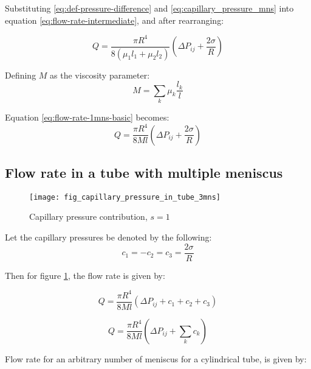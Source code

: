 	Substituting \ref{eq:def-pressure-difference} and \ref{eq:capillary_pressure_mns} into equation \ref{eq:flow-rate-intermediate}, and after rearranging:
	
	\begin{equation} \label{eq:flow-rate-1mns-basic}
		Q = \frac{\pi R^4}{8({\mu}_1 l_1 + {\mu}_2 l_2)} \left( \Delta P_{ij} + \frac{2\sigma}{R} \right)
	\end{equation}
	
	Defining $M$ as the viscosity parameter:
	\begin{equation}
		M = \sum_{k} \mu_{k} \frac{l_{k}}{l}
	\end{equation}
	
	Equation \ref{eq:flow-rate-1mns-basic} becomes:
	\begin{equation} \label{eq:flow-rate-1mns-basic-m}
		Q = \frac{\pi R^4}{8Ml} \left( \Delta P_{ij} + \frac{2\sigma}{R} \right)
	\end{equation}
	
\subsection{Flow rate in a tube with multiple meniscus}
	
	\begin{figure}[H]
		\centering
		\texttt{[image: fig\_capillary\_pressure\_in\_tube\_3mns]}
		\caption{Capillary pressure contribution, $s = 1$}
		\label{fig:capillary_pressure_in_tube_3mns}
	\end{figure}
	
	Let the capillary pressures be denoted by the following:
	\begin{equation}
		c_1 = -c_2 = c_3 = \frac{2 \sigma}{R}
	\end{equation}
	
	Then for figure \ref{fig:capillary_pressure_in_tube_3mns}, the flow rate is given by:
	
	\begin{equation}
		Q = \frac{\pi R^4}{8Ml} \left( \Delta P_{ij} + c_1 + c_2 + c_3 \right)
	\end{equation}
	
	\begin{equation}
		Q = \frac{\pi R^4}{8Ml} \left( \Delta P_{ij} + \sum_{k} c_{k} \right)
	\end{equation}
	
	Flow rate for an arbitrary number of meniscus for a cylindrical tube, is given by:
	
